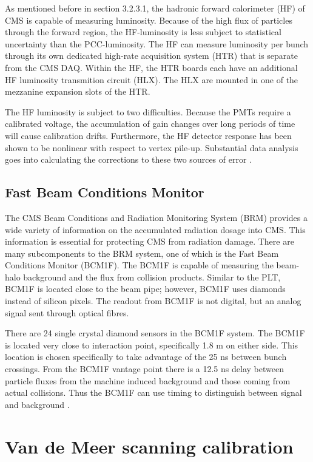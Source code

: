 As mentioned before in section 3.2.3.1, the hadronic forward calorimeter (HF) of CMS is capable of measuring luminosity. Because of the high flux of particles through the forward region, the HF-luminosity is less subject to statistical uncertainty than the PCC-luminosity. The HF can measure luminosity per bunch through its own dedicated high-rate acquisition system (HTR) that is separate from the CMS DAQ. Within the HF, the HTR boards each have an additional HF luminosity transmition circuit (HLX). The HLX are mounted in one of the mezzanine expansion slots of the HTR.

The HF luminosity is subject to two difficulties. Because the PMTs require a calibrated voltage, the accumulation of gain changes over long periods of time will cause calibration drifts. Furthermore, the HF detector response has been shown to be nonlinear with respect to vertex pile-up. Substantial data analysis goes into calculating the corrections to these two sources of error \cite{CMS:2013gfa}.  

\subsection{Fast Beam Conditions Monitor}

The CMS Beam Conditions and Radiation Monitoring System (BRM) provides a wide variety of information on the accumulated radiation dosage into CMS. This information is essential for protecting CMS from radiation damage. There are many subcomponents to the BRM system, one of which is the Fast Beam Conditions Monitor (BCM1F). The BCM1F is capable of measuring the beam-halo background and the flux from collision products. Similar to the PLT, BCM1F is located close to the beam pipe; however, BCM1F uses diamonds instead of silicon pixels. The readout from BCM1F is not digital, but an analog signal sent through optical fibres. 

There are 24 single crystal diamond sensors in the BCM1F system. The BCM1F is located very close to interaction point, specifically 1.8 m on either side. This location is chosen specifically to take advantage of the 25 ns between bunch crossings. From the BCM1F vantage point there is a 12.5 ns delay between particle fluxes from the machine induced background and those coming from actual collisions. Thus the BCM1F can use timing to distinguish between signal and background \cite{Guthoff:2017ibf}.  

\section{Van de Meer scanning calibration}

